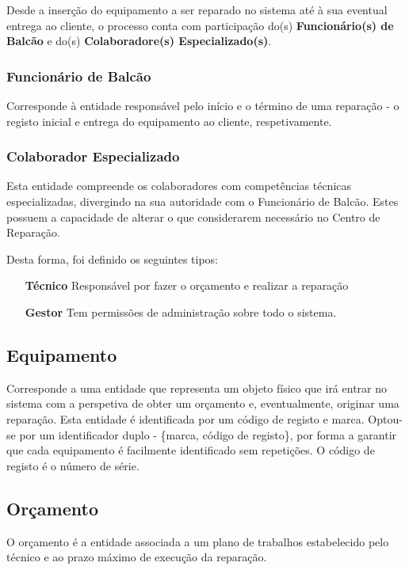 \documentclass[a4paper,12pt]{scrreprt}
\begin{document}
Desde a inserção do equipamento a ser reparado no sistema até à sua eventual entrega ao cliente, o processo conta com participação
do(s) \textbf{Funcionário(s) de Balcão} e do(s) \textbf{Colaboradore(s) Especializado(s)}.

\subsubsection{Funcionário de Balcão} \label{ent_func_balcao}
Corresponde à entidade responsável pelo início e o término de uma reparação - o registo inicial e entrega do equipamento ao cliente, respetivamente.  

\subsubsection{Colaborador Especializado} \label{ent_colab_especializado}
Esta entidade compreende os colaboradores com competências técnicas especializadas, divergindo na sua autoridade com o Funcionário de Balcão. 
Estes possuem a capacidade de alterar o que considerarem necessário no Centro de Reparação.

Desta forma, foi definido os seguintes tipos:
\begin{itemize}
    \item[\textbf{Técnico}]{Responsável por fazer o orçamento e realizar a reparação}
    \item[\textbf{Gestor}]{Tem permissões de administração sobre todo o sistema.}
\end{itemize}

\subsection{Equipamento} \label{ent_equipamento}
Corresponde a uma entidade que representa um objeto físico que irá entrar no sistema com a perspetiva de obter um orçamento e,
eventualmente, originar uma reparação.
Esta entidade é identificada por um código de registo e marca.
Optou-se por um identificador duplo - \{marca, código de registo\}, 
por forma a garantir que cada equipamento é facilmente identificado sem repetições.
O código de registo é o número de série.

\subsection{Orçamento} \label{ent_orcamento}
O orçamento é a entidade associada a um plano de trabalhos estabelecido pelo técnico e ao prazo máximo de execução da reparação.
\end{document}
